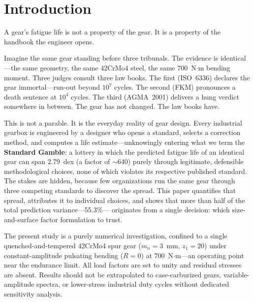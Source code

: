 \documentclass[twocolumn,12pt,a4paper]{article}
\begin{document}
\section{Introduction}
\label{sec:intro}

A gear's fatigue life is not a property of the gear. It is a property
of the handbook the engineer opens.

Imagine the same gear standing before three tribunals. The evidence is
identical---the same geometry, the same 42CrMo4 steel, the same 700~N$\cdot$m
bending moment. Three judges consult three law books. The first (ISO~6336)
declares the gear immortal---run-out beyond $10^7$ cycles. The second
(FKM) pronounces a death sentence at $10^4$ cycles. The third (AGMA~2001)
delivers a hung verdict somewhere in between. The gear has not changed.
The law books have.

This is not a parable. It is the everyday reality of gear design. Every
industrial gearbox is engineered by a designer who opens a standard,
selects a correction method, and computes a life estimate---unknowingly
entering what we term the \textbf{Standard Gamble}: a lottery in which
the predicted fatigue life of an identical gear can span
2.79~dex (a factor of $\sim$640) purely through legitimate, defensible
methodological choices, none of which violates its respective published
standard. The stakes are hidden, because few organizations run the same
gear through three competing standards to discover the spread. This
paper quantifies that spread, attributes it to individual choices, and
shows that more than half of the total prediction variance---55.3\%--- %
originates from a single decision: which size-and-surface factor
formulation to trust.

The present study is a purely numerical investigation, confined to a
single quenched-and-tempered 42CrMo4 spur gear ($m_n=3$~mm,
$z_1=20$) under constant-amplitude pulsating bending ($R=0$) at
700~N$\cdot$m---an operating point near the endurance limit. All
load factors are set to unity and residual stresses are absent.
Results should not be extrapolated to case-carburized gears,
variable-amplitude spectra, or lower-stress industrial duty cycles
without dedicated sensitivity analysis.
\end{document}
